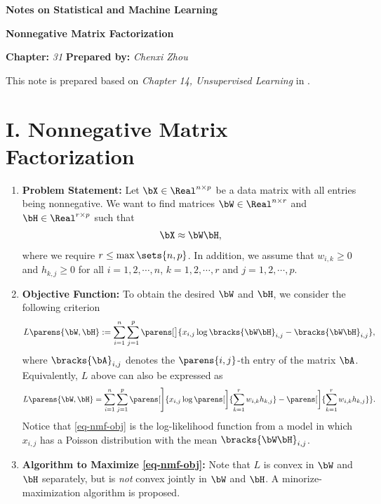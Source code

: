 \documentclass[12pt]{article}
\newcommand{\titlebox}[4]{
\begin{tcolorbox}[colback = blue!5!white!95, colframe = blue!70!black
]
  \noindent \textbf{ #1 } \hfill \textit{#2} 
  \begin{center}
  	 \LARGE{\textbf{#3}}
  \end{center}
\textbf{Chapter:} \textit{#4} \hfill \textbf{Prepared by:} \textit{Chenxi Zhou}
\end{tcolorbox}
}
\begin{document}
\titlebox{Notes on Statistical and Machine Learning}{}{Nonnegative Matrix Factorization}{31}
\thispagestyle{plain}

\vspace{10pt}

This note is prepared based on \textit{Chapter 14, Unsupervised Learning} in \textcite{Friedman2001-np}. 


\section*{I. Nonnegative Matrix Factorization}

\begin{enumerate}[label=\textbf{\arabic*.}]

	\item \textbf{Problem Statement:} Let $\bX \in \Real^{n \times p}$ be a data matrix with all entries being nonnegative. We want to find matrices $\bW \in \Real^{n \times r}$ and $\bH \in \Real^{r \times p}$ such that 
	\begin{align*}
		\bX \approx \bW \bH, 
	\end{align*}
	where we require $r \le \max \sets{n, p}$. In addition, we assume that $w_{i, k} \ge 0$ and $h_{k,j} \ge 0$ for all $i = 1, 2, \cdots, n$, $k=1,2,\cdots, r$ and $j=1,2,\cdots, p$. 
	
	\item \textbf{Objective Function:} To obtain the desired $\bW$ and $\bH$, we consider the following criterion 
	\begin{align}\label{eq-nmf-obj}
		L \parens{\bW, \bH} := \sum_{i=1}^n \sum_{j=1}^p \parens[\big]{x_{i,j} \log \bracks{\bW \bH}_{i,j} - \bracks{\bW \bH}_{i,j}}, 
	\end{align}
	where $\bracks{\bA}_{i,j}$ denotes the $\parens{i, j}$-th entry of the matrix $\bA$. Equivalently, $L$ above can also be expressed as 
	\begin{align*}
		L \parens{\bW, \bH} = \sum_{i=1}^n \sum_{j=1}^p \parens[\Bigg]{x_{i,j} \log \parens[\bigg]{\sum_{k=1}^r w_{i,k} h_{k,j}} - \parens[\bigg]{\sum_{k=1}^r w_{i,k} h_{k,j}}}. 
	\end{align*}
	Notice that \eqref{eq-nmf-obj} is the log-likelihood function from a model in which $x_{i,j}$ has a Poisson distribution with the mean $\bracks{\bW \bH}_{i,j}$. 
	
	\item \textbf{Algorithm to Maximize \eqref{eq-nmf-obj}:} Note that $L$ is convex in $\bW$ and $\bH$ separately, but is \emph{not} convex jointly in $\bW$ and $\bH$. A minorize-maximization algorithm is proposed. 
	

\end{enumerate}
\end{document}
